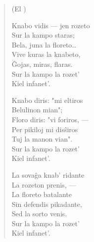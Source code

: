 \begin{verse}
\begin{center}
\footnotesize (El )
\end{center}

                    Knabo vidis --- jen rozeto\\
                    Sur la kampo staras;\\
                    Bela, juna la floreto\dots\\
                    Vive kuras la knabeto,\\
                    \^Gojas, miras, flaras.\\
                    Sur la kampo la rozet'\\
                    Kiel infanet'.

                     \vin    Knabo diris: "mi eltiros\\
                      \vin   Belulinon mian";\\
                      \vin   Floro diris: "vi foriros, ---\\
                     \vin    Per pikiloj mi dis\^siros\\
                     \vin    Tuj la manon vian".\\
                     \newpage
                      \vin   Sur la kampo la rozet'\\
                      \vin   Kiel infanet'.

                    La sova\^ga knab' ridante\\
                    La rozeton prenis, ---\\
                    La floreto batalante\\
                    Sin defendis pikadante,\\
                    Sed la sorto venis.\\
                    Sur la kampo la rozet'\\
                    Kiel infanet'.

\end{verse}

\smallrule{}